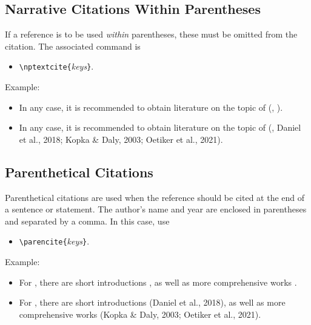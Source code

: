 \subsection{Narrative Citations Within Parentheses}

If a reference is to be used \emph{within} parentheses, these must be omitted
from the citation. The associated command is
%
\begin{itemize}
    \item[] \verb!\nptextcite{!\textit{keys}\verb!}!.
\end{itemize}
%
Example:
%
\begin{itemize}
\item[]
\begin{LaTeXCode}[numbers=none,breakindent=0pt]
In any case, it is recommended to obtain literature on the topic of \latex
(\eg, ).
\end{LaTeXCode}
\item[]
    In any case, it is recommended to obtain literature on the topic of \latex
    (\eg, Daniel et al., 2018; Kopka \& Daly, 2003; Oetiker et al., 2021).
\end{itemize}

\subsection{Parenthetical Citations}

Parenthetical citations are used when the reference should be cited at the end
of a sentence or statement. The author's name and year are enclosed in
parentheses and separated by a comma. In this case, use
%
\begin{itemize}
    \item[] \verb!\parencite{!\textit{keys}\verb!}!.
\end{itemize}
%
Example:
%
\begin{itemize}
\item[]
\begin{LaTeXCode}[numbers=none,breakindent=0pt]
For \latex, there are short introductions \parencite{Daniel2018}, as well as
more comprehensive works \parencite{Oetiker2021, Kopka2003}.
\end{LaTeXCode}
%
\item[]
    For \latex, there are short introductions (Daniel et al., 2018), as well as
    more comprehensive works (Kopka \& Daly, 2003; Oetiker et al., 2021).
\end{itemize}


